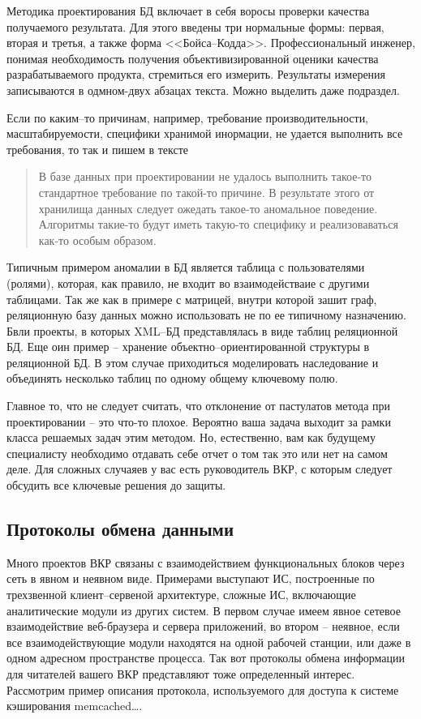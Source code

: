 \documentclass[a4paper,14pt,final]{extreport}
\begin{document}
Методика проектирования БД включает в себя воросы проверки качества получаемого результата.  Для этого введены три нормальные формы: первая, вторая и третья, а также форма <<Бойса--Кодда>>.  Профессиональный инженер, понимая необходимость получения объективизированной оценики качества разрабатываемого продукта, стремиться его измерить.  Результаты измерения записываются в одмном-двух абзацах текста.  Можно выделить даже подраздел.

Если по каким--то причинам, например, требование производительности, масштабируемости, специфики хранимой инормации, не удается выполнить все требования, то так и пишем в тексте
\begin{quote}
  В базе данных при проектировании не удалось выполнить такое-то стандартное требование по такой-то причине.  В результате этого от хранилища данных следует ожедать такое-то аномальное поведение.  Алгоритмы такие-то будут иметь такую-то специфику и реализоваваться как-то особым образом.
\end{quote}
Типичным примером аномалии в БД является таблица с пользователями (ролями), которая, как правило, не входит во взаимодействаие с другими таблицами.  Так же как в примере с матрицей, внутри которой зашит граф, реляционную базу данных можно использовать не по ее типичному назначению.  Бвли проекты, в которых XML--БД представлялась в виде таблиц реляционной БД.  Еще оин пример -- хранение объектно--ориентированной структуры в реляционной БД.  В этом случае приходиться моделировать наследование и объединять несколько таблиц по одному общему ключевому полю.

Главное то, что не следует считать, что отклонение от пастулатов метода при проектировании -- это что-то плохое.  Вероятно ваша задача выходит за рамки класса решаемых задач этим методом.  Но, естественно, вам как будущему специалисту необходимо отдавать себе отчет о том так это или нет на самом деле.  Для сложных случаяев у вас есть руководитель ВКР, с которым следует обсудить все ключевые решения до защиты.

\subsection{Протоколы обмена данными}
\label{sec:protodescr}

Много проектов ВКР связаны с взаимодействием функциональных блоков через сеть в явном и неявном виде.  Примерами выступают ИС, построенные по трехзвенной клиент--сервеной архитектуре, сложные ИС, включающие аналитические модули из других систем.  В первом случае имеем явное сетевое взаимодействие веб-браузера и сервера приложений, во втором -- неявное, если все взаимодействующие модули находятся на одной рабочей станции, или даже в одном адресном пространстве процесса.  Так вот протоколы обмена информации для читателей вашего ВКР представляют тоже определенный интерес.  Рассмотрим пример описания протокола, используемого для доступа к системе кэширования memcached\ldots{}.
\end{document}
